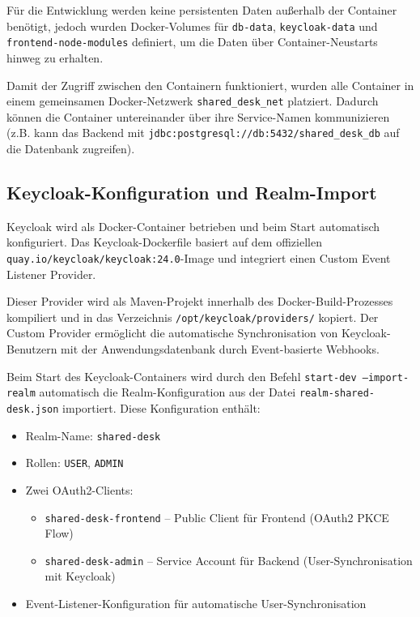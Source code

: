 \documentclass[11pt,a4paper]{report}
\begin{document}
Für die Entwicklung werden keine persistenten Daten außerhalb der Container benötigt, jedoch wurden Docker-Volumes für \texttt{db-data}, \texttt{keycloak-data} und \texttt{frontend-node-modules} definiert, um die Daten über Container-Neustarts hinweg zu erhalten.

Damit der Zugriff zwischen den Containern funktioniert, wurden alle Container in einem gemeinsamen Docker-Netzwerk \texttt{shared\_desk\_net} platziert. Dadurch können die Container untereinander über ihre Service-Namen kommunizieren (z.B. kann das Backend mit \texttt{jdbc:postgresql://db:5432/shared\_desk\_db} auf die Datenbank zugreifen).

\subsection{Keycloak-Konfiguration und Realm-Import}

Keycloak wird als Docker-Container betrieben und beim Start automatisch konfiguriert. Das Keycloak-Dockerfile basiert auf dem offiziellen \texttt{quay.io/keycloak/keycloak:24.0}-Image und integriert einen Custom Event Listener Provider.

Dieser Provider wird als Maven-Projekt innerhalb des Docker-Build-Prozesses kompiliert und in das Verzeichnis \texttt{/opt/keycloak/providers/} kopiert. Der Custom Provider ermöglicht die automatische Synchronisation von Keycloak-Benutzern mit der Anwendungsdatenbank durch Event-basierte Webhooks.

Beim Start des Keycloak-Containers wird durch den Befehl \texttt{start-dev --import-realm} automatisch die Realm-Konfiguration aus der Datei \texttt{realm-shared-desk.json} importiert. Diese Konfiguration enthält:

\begin{itemize}
    \item Realm-Name: \texttt{shared-desk}
    \item Rollen: \texttt{USER}, \texttt{ADMIN}
    \item Zwei OAuth2-Clients:
    \begin{itemize}
        \item \texttt{shared-desk-frontend} -- Public Client für Frontend (OAuth2 PKCE Flow)
        \item \texttt{shared-desk-admin} -- Service Account für Backend (User-Synchronisation mit Keycloak)
    \end{itemize}
    \item Event-Listener-Konfiguration für automatische User-Synchronisation
\end{itemize}
\end{document}
